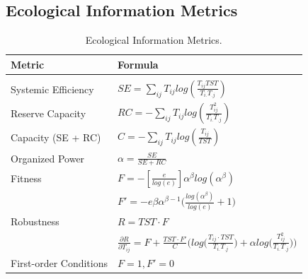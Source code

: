 \documentclass{article}
\begin{document}
\subsection{Ecological Information Metrics}

\begin{table}[H]
\caption{Ecological Information Metrics.}
\label{IOmetrics}
\vskip 0.15in
\begin{center}
\begin{sc}
\begin{tabular}{ l l}
\hline

Metric &  Formula  \\
\hline
&  \\
Systemic Efficiency
  & $SE = \displaystyle\sum_{ij}{T_{ij}} log(\frac{T_{ij}TST}{T_{i.}T_{.j}}) $ 
  \\[.25in]

Reserve Capacity 
  & $RC = - \displaystyle\sum_{ij}{T_{ij}} log(\frac{T_{ij}^2}{T_{i.}T_{.j}}) $ 
 \\[.25in]
  
Capacity (SE + RC)
  & $C = -\displaystyle\sum_{ij}{T_{ij}} log(\frac{T_{ij}}{TST}) $ 
   \\[.25in]

Organized Power  & $\alpha=\frac{SE}{SE + RC}$  \\[.25in]

Fitness
 
 & $F = -[\frac{e}{log(e)}] 
    \alpha^\beta log(\alpha^\beta)$ \\[.25in]

& $F' = -e \beta \alpha^{\beta - 1}
\bigg(
    \frac{log(\alpha^\beta)}  {log(e)} 
        + 1 
\bigg)$         \\[.25in]

Robustness & $R = TST \cdot F$\\[.25in]

& $\frac{\partial R}{\partial T_{ij}} = F + \frac{TST \cdot F'}{C}
\bigg(log \big(\frac{T_{ij} \cdot TST}{T_{i.} T_{.j}} \big) 
+ \alpha log \big( \frac{T^{2}_{ij}}{T_{i.}T_{.j}} 
\big) \bigg)$ \\[.25in]

First-order Conditions & $F = 1, F'=0$ \\[.25in]

\end{tabular}
\end{sc}
\end{center}
\vskip -0.1in
\end{table}
\end{document}
